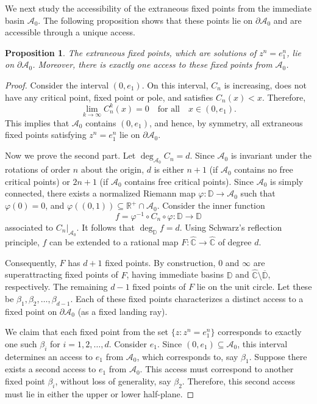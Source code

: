 \documentclass[12pt]{article}
\newtheorem{prop}{Proposition}[section]
\begin{document}
We next study the accessibility of the extraneous fixed points from the immediate basin $\mathcal{A}_0$. The following proposition shows that these points lie on $\partial \mathcal{A}_0$ and are accessible through a unique access.
\begin{prop}\label{e_1onBdryA_0}
	The extraneous fixed points, which are solutions of $z^{n}=e_{1}^{n}$, lie on $\partial \mathcal{A}_{0}$. Moreover, there is exactly one access to these fixed points from $\mathcal{A}_0$.
\end{prop}
\begin{proof}
	Consider the interval $(0,e_{1})$. On this interval, $C_{n}$ is increasing, does not have any critical point, fixed point or pole, and satisfies $C_{n}(x) < x$. Therefore,  
	$$\lim_{k\rightarrow\infty} C_{n}^{k}(x) = 0 \quad \text{for all}\quad x \in (0,e_{1}).$$
	This implies that $\mathcal{A}_{0}$ contains $(0,e_{1})$, and hence, by symmetry, all extraneous fixed points satisfying $z^{n}=e_{1}^{n}$ lie on $\partial \mathcal{A}_{0}$.  
	
	Now we prove the second part. Let $\deg_{\mathcal{A}_{0}} C_{n} = d$. Since  $\mathcal{A}_0$ is invariant under the rotations of order $n$ about the origin, $d$ is either $n+1$ (if $\mathcal{A}_{0}$ contains no free critical points) or $2n+1$ (if $\mathcal{A}_{0}$ contains free critical points).  Since $\mathcal{A}_{0}$ is simply connected, there exists a normalized Riemann map $\varphi : \mathbb{D} \rightarrow \mathcal{A}_{0}$ such that $\varphi(0)=0$, and $\varphi((0,1)) \subseteq \mathbb{R}^{+} \cap \mathcal{A}_{0}$. Consider the inner function    
	$$f = \varphi^{-1} \circ C_{n} \circ \varphi : \mathbb{D} \rightarrow \mathbb{D}$$ associated to $C_{n}|_{\mathcal{A}_{0}}$. It follows that $\deg_{\mathbb{D}} f = d$. Using Schwarz's reflection principle, $f$ can be extended to a rational map $F : \widehat{\mathbb{C}} \rightarrow \widehat{\mathbb{C}}$ of degree $d$.
	
	Consequently, $F$ has $d+1$ fixed points. By construction, $0$ and $\infty$ are superattracting fixed points of $F$, having immediate basins $\mathbb{D}$ and $\widehat{\mathbb{C}} \setminus \overline{\mathbb{D}}$, respectively.  The remaining $d-1$ fixed points of $F$ lie on the unit circle. Let these be $\beta_{1}, \beta_{2}, \dots, \beta_{d-1}$. Each of these fixed points characterizes a distinct access to a fixed point on $\partial \mathcal{A}_{0}$ (as a fixed landing ray).  
	
	We claim that each fixed point from the set
	$\{z : z^{n} = e_{1}^{n}\}$ corresponds to exactly one such $\beta_{i}$ for $i = 1, 2, \dots, d$.  Consider $e_1$. Since $(0,e_1) \subseteq \mathcal{A}_0$, this interval determines an access to $e_{1}$ from $\mathcal{A}_{0}$, which corresponds to, say $\beta_{1}$. Suppose there exists a second access to $e_{1}$ from $\mathcal{A}_0$. This access must correspond to another fixed point $\beta_{i}$, without loss of generality, say $\beta_{2}$. Therefore, this second access must lie in either the upper or lower half-plane.  
	

\end{proof}
\end{document}

